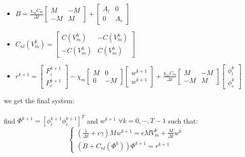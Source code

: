\documentclass[a4paper,11pt]{article}
\begin{document}
\begin{itemize}
\item $B=\frac{\chi_m C_m}{\Delta t} \begin{bmatrix} M &-M \\-M & M \end{bmatrix}+\begin{bmatrix} A_i & 0 \\ 0 & A_e \end{bmatrix}$
\item $C_{nl}(V_m^k)=\begin{bmatrix}C(V_m^h) & -C(V_m^h) \\ -C(V_m^h) & C(V_m^h) \end{bmatrix}$
\item $r^{k+1}=\begin{bmatrix} F_i^{k+1} \\ F_e^{k+1}\end{bmatrix}-\chi_m \begin{bmatrix}M & 0 \\ 0 & -M \end{bmatrix} \begin{bmatrix}w^{k+1} \\ w^{k+1} \end{bmatrix}+\frac{\chi_m C_m}{\Delta t} \begin{bmatrix} M &-M \\-M & M \end{bmatrix} \begin{bmatrix} \phi_i^k \\ \phi_e^k \end{bmatrix}$
\end{itemize} \vspace{4mm}
we get the final system:\\ \\
find $\Phi^{k+1}=[\phi_i^{k+1} \phi_e^{k+1}]^T$ and $w^{k+1}$ $\forall k=0,\cdots,T-1$ such that:
\begin{equation}
\begin{cases}
(\frac{1}{\Delta t}+\epsilon \gamma)M w^{k+1}=\epsilon M V_m^k+\frac{M}{\Delta t} w^k \\
(B+C_{nl}(\Phi^k)) \Phi^{k+1}=r^{k+1}
\end{cases}
\end{equation} 
\end{document}
